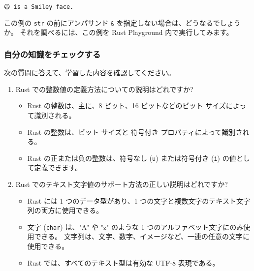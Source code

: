\begin{lstlisting}[numbers=none]
😃 is a Smiley face.
\end{lstlisting}

この例の \texttt{str} の前にアンパサンド \texttt{\&} を指定しない場合は、どうなるでしょうか。 それを調べるには、この例を Rust Playground 内で実行してみます。


\subsubsection{自分の知識をチェックする}

次の質問に答えて、学習した内容を確認してください。

\begin{enumerate}
\item Rust での整数値の定義方法についての説明はどれですか?

\begin{itemize}
\item Rust の整数は、主に、8 ビット、16 ビットなどのビット サイズによって識別される。

\item Rust の整数は、ビット サイズと 符号付き プロパティによって識別される。

\item Rust の正または負の整数は、符号なし (\texttt{u}) または符号付き (\texttt{i}) の値として定義できます。
\end{itemize}

\item Rust でのテキスト文字値のサポート方法の正しい説明はどれですか?

\begin{itemize}
\item Rust には 1 つのデータ型があり、1 つの文字と複数文字のテキスト文字列の両方に使用できる。

\item 文字 (\texttt{char}) は、"A" や "z" のような 1 つのアルファベット文字にのみ使用できる。 文字列は、文字、数字、イメージなど、一連の任意の文字に使用できる。

\item Rust では、すべてのテキスト型は有効な UTF-8 表現である。
\end{itemize}

\end{enumerate}

